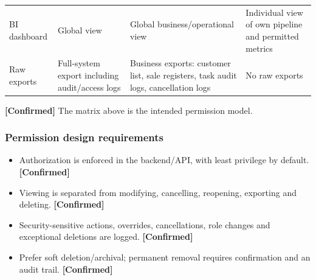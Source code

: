 \documentclass[11pt,a4paper]{article}
\newcommand{\tagconf}{\textcolor{green!45!black}{\textbf{[Confirmed]}}}
\begin{document}
\begin{longtable}{@{}L{2.6cm}L{4.5cm}L{4.4cm}L{4.3cm}@{}}
	BI dashboard                                                      & Global view                                                                                         & Global business/operational view                                            & Individual view
	of own pipeline and permitted metrics                                                                                                                                                                                                                                                                                              \\
	Raw exports                                                       & Full-system export including audit/access logs                                                      & Business exports:
	customer list, sale registers, task audit logs, cancellation logs & No raw
	exports                                                                                                                                                                                                                                                                                                                            \\
	\bottomrule
\end{longtable}
\tagconf{} The matrix above is the intended permission model.

\subsubsection*{Permission design requirements}
\begin{itemize}
	\item Authorization is enforced in the backend/API, with least privilege by
	      default. \tagconf{}
	\item Viewing is separated from modifying, cancelling, reopening, exporting
	      and deleting. \tagconf{}
	\item Security-sensitive actions, overrides, cancellations, role changes and exceptional deletions are logged. \tagconf{}
	\item Prefer soft deletion/archival; permanent removal requires confirmation and an audit trail. \tagconf{}
\end{itemize}
\end{document}
